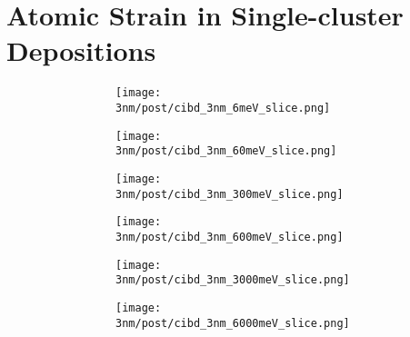 \clearpage
\section{Atomic Strain in Single-cluster Depositions}
\begin{figure}[!h] \centering
	\captionsetup[subfigure]{justification=centering}
	\begin{subfigure}{0.5\linewidth} 
		\begin{subfigure}{0.33\linewidth} \centering %
			\texttt{[image: 3nm/post/cibd\_3nm\_6meV\_slice.png]} 
		\end{subfigure}%
		\begin{subfigure}{0.33\linewidth} \centering %
			\texttt{[image: 3nm/post/cibd\_3nm\_60meV\_slice.png]} 
		\end{subfigure}%
		\begin{subfigure}{0.33\linewidth} \centering	%
		\texttt{[image: 3nm/post/cibd\_3nm\_300meV\_slice.png]} 
		\end{subfigure}%
		\vfill
		\begin{subfigure}{0.33\linewidth} \centering %
		\texttt{[image: 3nm/post/cibd\_3nm\_600meV\_slice.png]} 
		\end{subfigure}%
		\begin{subfigure}{0.33\linewidth} \centering %
		\texttt{[image: 3nm/post/cibd\_3nm\_3000meV\_slice.png]} 
		\end{subfigure}%
		\begin{subfigure}{0.33\linewidth} \centering %
		\texttt{[image: 3nm/post/cibd\_3nm\_6000meV\_slice.png]} 
		\end{subfigure}

\end{subfigure}
\end{figure}
